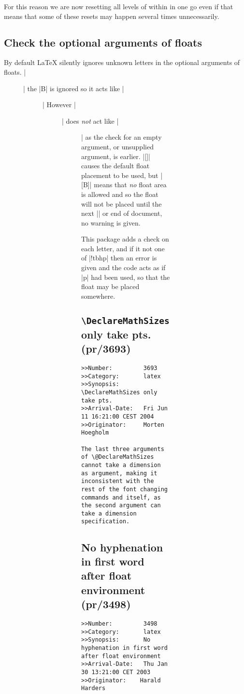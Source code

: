 \documentclass{ltxguide}
\begin{document}
For this reason we are now resetting all levels of within in one go
even if that means that some of these resets may happen several times
unnecessarily.


\subsection{Check the optional arguments of floats}

By default LaTeX silently ignores unknown letters in the optional
arguments of floats. |\begin{figure}[tB]| the |B| is ignored so it
acts like |\begin{figure}[t]| However |\begin{figure}[B]| does
\emph{not} act like |\begin{figure}[]| as the check for an empty
argument, or unsupplied argument, is earlier. |[]| causes the
default float placement to be used, but |[B]| means that \emph{no}
float area is allowed and so the float will not be placed until the
next |\clearpage| or end of document, no warning is given.

This package adds a check on each letter, and if it not one of
|!tbhp| then an error is given and the code acts as if |p| had been
used, so that the float may be placed somewhere.

\subsection{\texttt{\textbackslash DeclareMathSizes} only take pts.
    (pr/3693)}

\begin{verbatim}
>>Number:         3693
>>Category:       latex
>>Synopsis:       \DeclareMathSizes only take pts.
>>Arrival-Date:   Fri Jun 11 16:21:00 CEST 2004
>>Originator:     Morten Hoegholm

The last three arguments of \@DeclareMathSizes cannot take a dimension
as argument, making it inconsistent with the rest of the font changing
commands and itself, as the second argument can take a dimension
specification.
\end{verbatim}

\subsection{No hyphenation in first word after float environment (pr/3498)}

\begin{verbatim}
>>Number:         3498
>>Category:       latex
>>Synopsis:       No hyphenation in first word after float environment
>>Arrival-Date:   Thu Jan 30 13:21:00 CET 2003
>>Originator:    Harald Harders


\end{verbatim}
\end{figure}
\end{figure}
\end{figure}
\end{figure}
\end{document}
